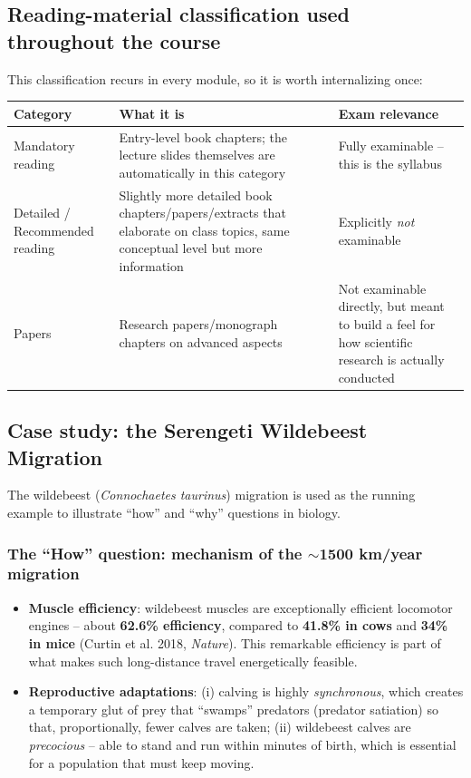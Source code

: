 \documentclass[11pt,a4paper]{article}
\begin{document}
\subsection{Reading-material classification used throughout the course}
This classification recurs in every module, so it is worth internalizing once:
\begin{center}
\begin{tabularx}{\textwidth}{@{}l X X@{}}
\toprule
\textbf{Category} & \textbf{What it is} & \textbf{Exam relevance} \\
\midrule
Mandatory reading & Entry-level book chapters; the lecture slides themselves are automatically in this category & Fully examinable -- this is the syllabus \\
Detailed / Recommended reading & Slightly more detailed book chapters/papers/extracts that elaborate on class topics, same conceptual level but more information & Explicitly \emph{not} examinable \\
Papers & Research papers/monograph chapters on advanced aspects & Not examinable directly, but meant to build a feel for how scientific research is actually conducted \\
\bottomrule
\end{tabularx}
\end{center}

\subsection{Case study: the Serengeti Wildebeest Migration}
The wildebeest (\emph{Connochaetes taurinus}) migration is used as the running example to illustrate ``how'' and ``why'' questions in biology.

\subsubsection*{The ``How'' question: mechanism of the $\sim$1500 km/year migration}
\begin{itemize}[leftmargin=1.5em]
\item \textbf{Muscle efficiency}: wildebeest muscles are exceptionally efficient locomotor engines -- about \textbf{62.6\% efficiency}, compared to \textbf{41.8\% in cows} and \textbf{34\% in mice} (Curtin et al. 2018, \emph{Nature}). This remarkable efficiency is part of what makes such long-distance travel energetically feasible.
\item \textbf{Reproductive adaptations}: (i) calving is highly \emph{synchronous}, which creates a temporary glut of prey that ``swamps'' predators (predator satiation) so that, proportionally, fewer calves are taken; (ii) wildebeest calves are \emph{precocious} -- able to stand and run within minutes of birth, which is essential for a population that must keep moving.
\end{itemize}
\end{document}
